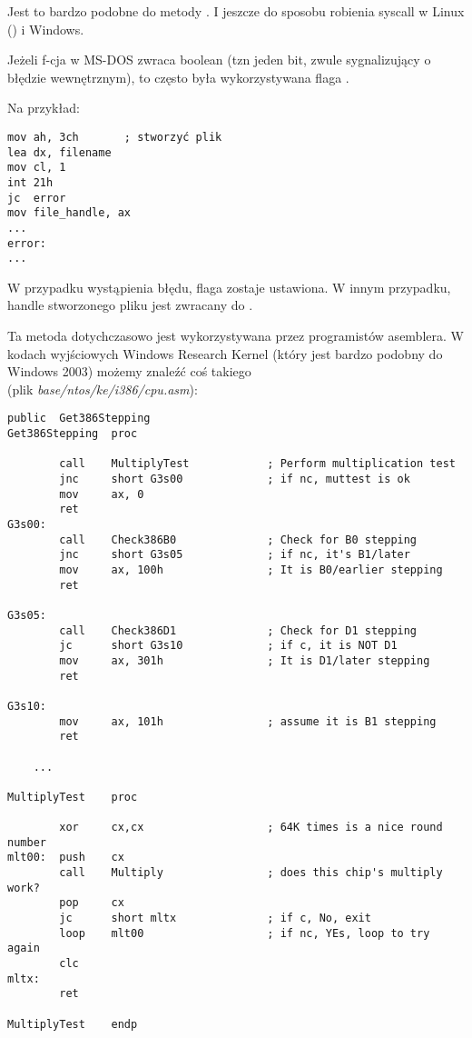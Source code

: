 Jest to bardzo podobne do metody .
I jeszcze do sposobu robienia syscall w Linux () i Windows.

Jeżeli f-cja w MS-DOS zwraca boolean (tzn jeden bit, zwule sygnalizujący o błędzie wewnętrznym),
to często była wykorzystywana flaga .

Na przykład:

\begin{lstlisting}[style=customasmx86]
mov ah, 3ch       ; stworzyć plik
lea dx, filename
mov cl, 1
int 21h
jc  error
mov file_handle, ax
...
error:
...
\end{lstlisting}

W przypadku wystąpienia błędu, flaga  zostaje ustawiona.
W innym przypadku, handle stworzonego pliku jest zwracany do .

Ta metoda dotychczasowo jest wykorzystywana przez programistów asemblera.
W kodach wyjściowych Windows Research Kernel (który jest bardzo podobny do Windows 2003) możemy znaleźć coś takiego\\
(plik \emph{base/ntos/ke/i386/cpu.asm}):

\begin{lstlisting}[style=customasmx86]
        public  Get386Stepping
Get386Stepping  proc

        call    MultiplyTest            ; Perform multiplication test
        jnc     short G3s00             ; if nc, muttest is ok
        mov     ax, 0
        ret
G3s00:
        call    Check386B0              ; Check for B0 stepping
        jnc     short G3s05             ; if nc, it's B1/later
        mov     ax, 100h                ; It is B0/earlier stepping
        ret

G3s05:
        call    Check386D1              ; Check for D1 stepping
        jc      short G3s10             ; if c, it is NOT D1
        mov     ax, 301h                ; It is D1/later stepping
        ret

G3s10:
        mov     ax, 101h                ; assume it is B1 stepping
        ret

	...

MultiplyTest    proc

        xor     cx,cx                   ; 64K times is a nice round number
mlt00:  push    cx
        call    Multiply                ; does this chip's multiply work?
        pop     cx
        jc      short mltx              ; if c, No, exit
        loop    mlt00                   ; if nc, YEs, loop to try again
        clc
mltx:
        ret

MultiplyTest    endp
\end{lstlisting}



